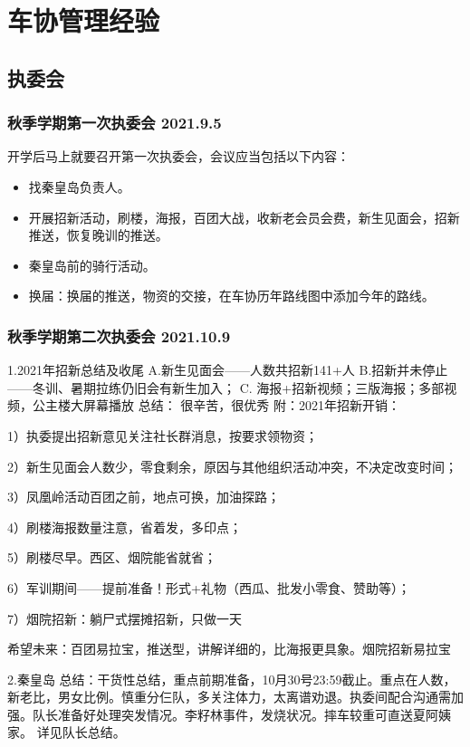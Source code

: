 \documentclass{ctexbook}
\begin{document}
\chapter{车协管理经验}
\section{执委会}
\subsection{秋季学期第一次执委会 2021.9.5}
开学后马上就要召开第一次执委会，会议应当包括以下内容：
\begin{itemize}
    \item 找秦皇岛负责人。
    \item 开展招新活动，刷楼，海报，百团大战，收新老会员会费，新生见面会，招新推送，恢复晚训的推送。
    \item 秦皇岛前的骑行活动。
    \item 换届：换届的推送，物资的交接，在车协历年路线图中添加今年的路线。
\end{itemize}



\subsection{秋季学期第二次执委会 2021.10.9}
1.2021年招新总结及收尾 A.新生见面会——人数共招新141+人 B.招新并未停止——冬训、暑期拉练仍旧会有新生加入； C. 海报+招新视频；三版海报；多部视频，公主楼大屏幕播放 总结： 很辛苦，很优秀 附：2021年招新开销： 

1）执委提出招新意见关注社长群消息，按要求领物资；

2）新生见面会人数少，零食剩余，原因与其他组织活动冲突，不决定改变时间；

3）凤凰岭活动百团之前，地点可换，加油探路；

4）刷楼海报数量注意，省着发，多印点；

5）刷楼尽早。西区、烟院能省就省；

6）军训期间——提前准备！形式+礼物（西瓜、批发小零食、赞助等）；

7）烟院招新：躺尸式摆摊招新，只做一天

希望未来：百团易拉宝，推送型，讲解详细的，比海报更具象。烟院招新易拉宝 

2.秦皇岛 总结：干货性总结，重点前期准备，10月30号23:59截止。重点在人数，新老比，男女比例。慎重分仨队，多关注体力，太离谱劝退。执委间配合沟通需加强。队长准备好处理突发情况。李籽林事件，发烧状况。摔车较重可直送夏阿姨家。 详见队长总结。
\end{document}
